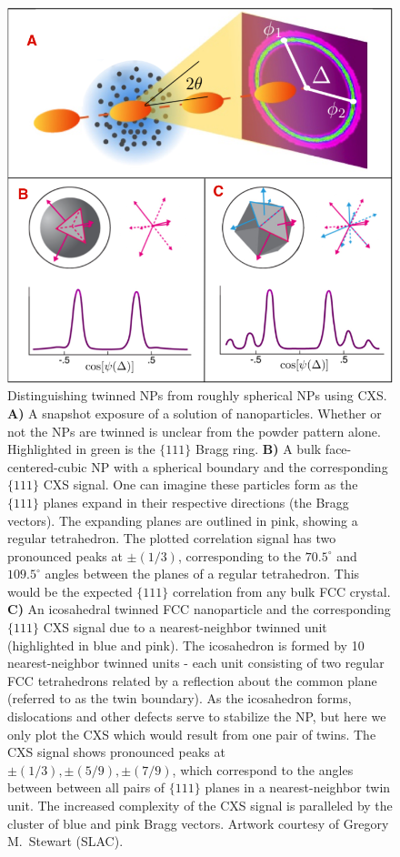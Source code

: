 \documentclass [11pt,fleqn]{article}
\begin{document}
\begin{figure}[H]
\begin{center}
\includegraphics[width=\textwidth,height=\textheight,keepaspectratio]{./fig1_new_version2.png}
\end{center}
\caption{Distinguishing twinned NPs from roughly spherical NPs using CXS. \textbf{A)} A snapshot exposure of a solution of nanoparticles. Whether or not the NPs are twinned is unclear from the powder pattern alone. Highlighted in green is the $\{111\}$ Bragg ring. \textbf{B)} A bulk face-centered-cubic NP with a spherical boundary and the corresponding $\{111\}$ CXS signal. One can imagine these particles form as the $\{111\}$ planes expand in their respective directions (the Bragg vectors). The expanding planes are outlined in pink, showing a regular tetrahedron. The plotted correlation signal has two pronounced peaks at $\pm (1/3)$, corresponding to the $70.5^{\circ}$ and $109.5^{\circ}$ angles between the planes of a regular tetrahedron. This would be the expected $\{111\}$ correlation from any bulk FCC crystal. \textbf{C)} An icosahedral twinned FCC nanoparticle and the corresponding $\{111\}$ CXS signal due to a nearest-neighbor twinned unit (highlighted in blue and pink). The icosahedron is formed by 10 nearest-neighbor twinned units - each unit consisting of two regular FCC tetrahedrons related by a reflection about the common plane (referred to as the twin boundary). As the icosahedron forms, dislocations and other defects serve to stabilize the NP, but here we only plot the CXS which would result from one pair of twins. The CXS signal shows pronounced peaks at $\pm (1/3), \pm (5/9), \pm (7/9)$, which correspond to the angles between between all pairs of $\{111\}$ planes in a nearest-neighbor twin unit. The increased complexity of the CXS signal is paralleled by the cluster of blue and pink Bragg vectors. Artwork courtesy of Gregory M.~Stewart (SLAC).}
\label{fig:contrast}
\end{figure}
\end{document}

